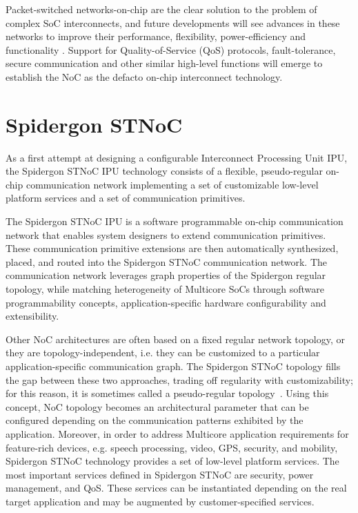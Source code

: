 Packet-switched networks-on-chip are the clear solution to the problem of complex SoC interconnects, and future developments will see advances in these networks to improve their performance, flexibility, power-efficiency and functionality \cite{furber2005future}. 
Support for Quality-of-Service (QoS) protocols, fault-tolerance, secure communication and other similar high-level functions will emerge to establish the NoC as the defacto on-chip interconnect technology.

\section{Spidergon STNoC}\label{C:stnoc}

As a first attempt at designing a configurable Interconnect Processing Unit IPU, the Spidergon STNoC IPU technology consists of a flexible, pseudo-regular on-chip communication network implementing a set of customizable low-level platform services and a set of communication primitives.

The Spidergon STNoC IPU is a software programmable on-chip communication network that enables system designers to extend communication primitives. 
These communication primitive extensions are then automatically synthesized, placed, and routed into the Spidergon STNoC communication network. 
The communication network leverages graph properties of the Spidergon regular topology, while matching heterogeneity of Multicore SoCs through software programmability concepts, application-specific hardware configurability and extensibility.

Other NoC architectures are often based on a fixed regular network topology, or they are topology-independent, i.e. they can be customized to a particular application-specific communication graph. 
The Spidergon STNoC topology fills the gap between these two approaches, trading off regularity with customizability; for this reason, it is sometimes called a pseudo-regular topology~\cite{coppola2008design}. 
Using this concept, NoC topology becomes an architectural parameter that can be configured depending on the communication patterns exhibited by the application. 
Moreover, in order to address Multicore application requirements for feature-rich devices, e.g. speech processing, video, GPS, security, and mobility, Spidergon STNoC technology provides a set of low-level platform services. 
The most important services defined in Spidergon STNoC are security, power management, and QoS. 
These services can be instantiated depending on the real target application and may be augmented by customer-specified services.

